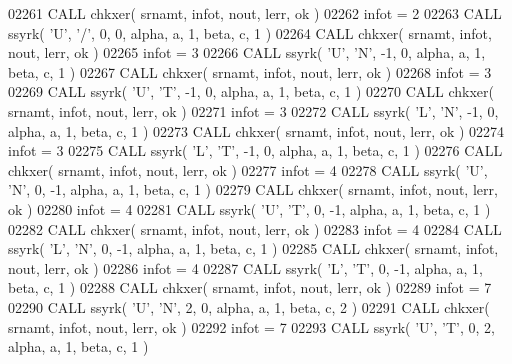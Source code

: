 \begin{DoxyCode}
02261       \textcolor{keyword}{CALL }chkxer( srnamt, infot, nout, lerr, ok )
02262       infot = 2
02263       \textcolor{keyword}{CALL }ssyrk( \textcolor{stringliteral}{'U'}, \textcolor{stringliteral}{'/'}, 0, 0, alpha, a, 1, beta, c, 1 )
02264       \textcolor{keyword}{CALL }chkxer( srnamt, infot, nout, lerr, ok )
02265       infot = 3
02266       \textcolor{keyword}{CALL }ssyrk( \textcolor{stringliteral}{'U'}, \textcolor{stringliteral}{'N'}, -1, 0, alpha, a, 1, beta, c, 1 )
02267       \textcolor{keyword}{CALL }chkxer( srnamt, infot, nout, lerr, ok )
02268       infot = 3
02269       \textcolor{keyword}{CALL }ssyrk( \textcolor{stringliteral}{'U'}, \textcolor{stringliteral}{'T'}, -1, 0, alpha, a, 1, beta, c, 1 )
02270       \textcolor{keyword}{CALL }chkxer( srnamt, infot, nout, lerr, ok )
02271       infot = 3
02272       \textcolor{keyword}{CALL }ssyrk( \textcolor{stringliteral}{'L'}, \textcolor{stringliteral}{'N'}, -1, 0, alpha, a, 1, beta, c, 1 )
02273       \textcolor{keyword}{CALL }chkxer( srnamt, infot, nout, lerr, ok )
02274       infot = 3
02275       \textcolor{keyword}{CALL }ssyrk( \textcolor{stringliteral}{'L'}, \textcolor{stringliteral}{'T'}, -1, 0, alpha, a, 1, beta, c, 1 )
02276       \textcolor{keyword}{CALL }chkxer( srnamt, infot, nout, lerr, ok )
02277       infot = 4
02278       \textcolor{keyword}{CALL }ssyrk( \textcolor{stringliteral}{'U'}, \textcolor{stringliteral}{'N'}, 0, -1, alpha, a, 1, beta, c, 1 )
02279       \textcolor{keyword}{CALL }chkxer( srnamt, infot, nout, lerr, ok )
02280       infot = 4
02281       \textcolor{keyword}{CALL }ssyrk( \textcolor{stringliteral}{'U'}, \textcolor{stringliteral}{'T'}, 0, -1, alpha, a, 1, beta, c, 1 )
02282       \textcolor{keyword}{CALL }chkxer( srnamt, infot, nout, lerr, ok )
02283       infot = 4
02284       \textcolor{keyword}{CALL }ssyrk( \textcolor{stringliteral}{'L'}, \textcolor{stringliteral}{'N'}, 0, -1, alpha, a, 1, beta, c, 1 )
02285       \textcolor{keyword}{CALL }chkxer( srnamt, infot, nout, lerr, ok )
02286       infot = 4
02287       \textcolor{keyword}{CALL }ssyrk( \textcolor{stringliteral}{'L'}, \textcolor{stringliteral}{'T'}, 0, -1, alpha, a, 1, beta, c, 1 )
02288       \textcolor{keyword}{CALL }chkxer( srnamt, infot, nout, lerr, ok )
02289       infot = 7
02290       \textcolor{keyword}{CALL }ssyrk( \textcolor{stringliteral}{'U'}, \textcolor{stringliteral}{'N'}, 2, 0, alpha, a, 1, beta, c, 2 )
02291       \textcolor{keyword}{CALL }chkxer( srnamt, infot, nout, lerr, ok )
02292       infot = 7
02293       \textcolor{keyword}{CALL }ssyrk( \textcolor{stringliteral}{'U'}, \textcolor{stringliteral}{'T'}, 0, 2, alpha, a, 1, beta, c, 1 )

\end{DoxyCode}
